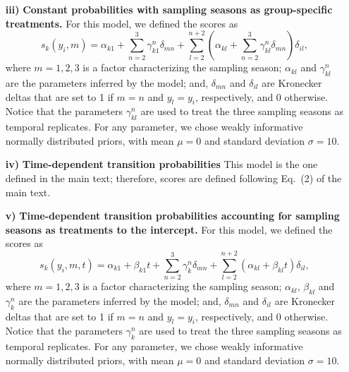 \documentclass[11pt, a4paper]{article}
\begin{document}
\begin{itemize}
\item[\textbf{iii)}] \textbf{Constant probabilities with sampling seasons as group-specific treatments.}  For this model, we defined the scores as
\begin{equation}
s_k\left(y_i, m\right)=\alpha_{k1} + \sum_{n=2}^{3} \gamma_{k1}^n\delta_{mn} + \sum_{l=2}^{n+2} \left(\alpha_{kl} + \sum_{n=2}^{3} \gamma_{kl}^n\delta_{mn}\right)\delta_{il},
\end{equation}
where $m={1,2,3}$ is a factor characterizing the sampling season; $\alpha_{kl}$ and $\gamma_{kl}^n$ are the parameters inferred by the model; and, $\delta_{mn}$ and $\delta_{il}$ are Kronecker deltas that are set to 1 if $m=n$ and $y_l=y_i$, respectively, and 0 otherwise. Notice that the parameters $\gamma_{kl}^n$ are used to treat the three sampling seasons as temporal replicates. For any parameter, we chose weakly informative normally distributed priors, with mean $\mu=0$ and standard deviation $\sigma=10$.

\item[\textbf{iv)}] \textbf{Time-dependent transition probabilities}  This model is the one defined in the main text; therefore, scores are defined following Eq.~(2) of the main text.

\item[\textbf{v)}] \textbf{Time-dependent transition probabilities accounting for sampling seasons as treatments to the intercept.} For this model, we defined the scores as
\begin{equation}
s_k\left(y_i, m, t\right)=\alpha_{k1} +\beta_{k1} t + \sum_{n=2}^{3} \gamma_{k}^n\delta_{mn} + \sum_{l=2}^{n+2} \left(\alpha_{kl}+\beta_{kl} t\right)\delta_{il},
\end{equation}
where $m={1,2,3}$ is a factor characterizing the sampling season; $\alpha_{kl}$, $\beta_{kl}$ and $\gamma_{k}^n$ are the parameters inferred by the model; and, $\delta_{mn}$ and $\delta_{il}$ are Kronecker deltas that are set to 1 if $m=n$ and $y_l=y_i$, respectively, and 0 otherwise. Notice that the parameters $\gamma_{k}^n$ are used to treat the three sampling seasons as temporal replicates. For any parameter, we chose weakly informative normally distributed priors, with mean $\mu=0$ and standard deviation $\sigma=10$.


\end{itemize}
\end{document}
